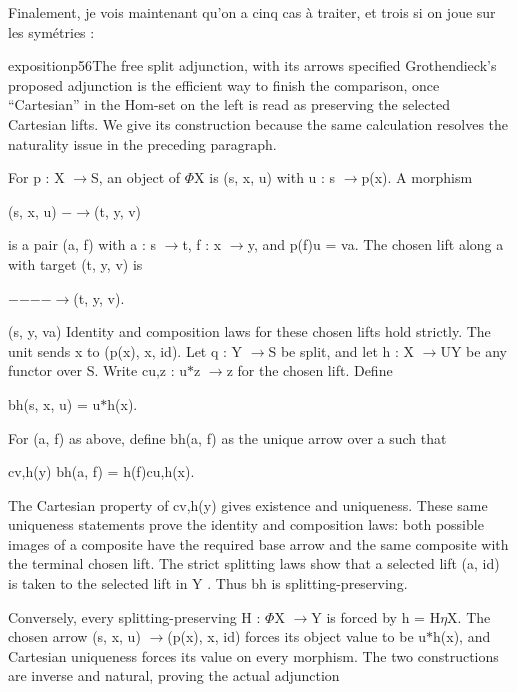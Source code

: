 Finalement, je vois maintenant qu'on a cinq cas à traiter, et trois si on joue sur les symétries :


\begin{dcomment}{exposition}{p56}{The free split adjunction, with its arrows specified}
Grothendieck’s proposed adjunction is the efficient way to finish the comparison, once “Cartesian” in the Hom-set on the left is read as preserving the selected Cartesian lifts. We give its construction because the same calculation resolves the naturality issue in the preceding paragraph.

For p : X \ensuremath{\to}S, an object of \ensuremath{\Phi}X is (s, x, u) with u : s \ensuremath{\to}p(x). A morphism

(s, x, u) \ensuremath{-}\ensuremath{\to}(t, y, v)

is a pair (a, f) with a : s \ensuremath{\to}t, f : x \ensuremath{\to}y, and p(f)u = va. The chosen lift along a with target (t, y, v) is

\ensuremath{-}\ensuremath{-}\ensuremath{-}\ensuremath{-}\ensuremath{\to}(t, y, v).

(s, y, va) Identity and composition laws for these chosen lifts hold strictly. The unit sends x to (p(x), x, id). Let q : Y \ensuremath{\to}S be split, and let h : X \ensuremath{\to}UY be any functor over S. Write cu,z : u\ensuremath{*}z \ensuremath{\to}z for the chosen lift. Define

bh(s, x, u) = u\ensuremath{*}h(x).

For (a, f) as above, define bh(a, f) as the unique arrow over a such that

cv,h(y) bh(a, f) = h(f)cu,h(x).

The Cartesian property of cv,h(y) gives existence and uniqueness. These same uniqueness statements prove the identity and composition laws: both possible images of a composite have the required base arrow and the same composite with the terminal chosen lift. The strict splitting laws show that a selected lift (a, id) is taken to the selected lift in Y . Thus bh is splitting-preserving.

Conversely, every splitting-preserving H : \ensuremath{\Phi}X \ensuremath{\to}Y is forced by h = H\ensuremath{\eta}X. The chosen arrow (s, x, u) \ensuremath{\to}(p(x), x, id) forces its object value to be u\ensuremath{*}h(x), and Cartesian uniqueness forces its value on every morphism. The two constructions are inverse and natural, proving the actual adjunction


\end{dcomment}
